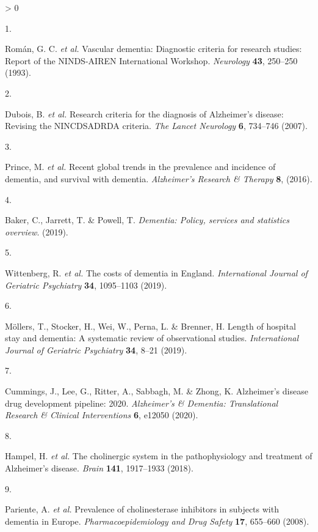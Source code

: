 \documentclass[a4paper, twoside]{templates/ociamthesis}
\newlength{\cslhangindent}
\newlength{\csllabelwidth}
\newenvironment{CSLReferences}[3] %
 {%
  \setlength{\parindent}{0pt}
  \ifodd #1 \everypar{\setlength{\hangindent}{\cslhangindent}}\ignorespaces\fi
  \ifnum #2 > 0
  \setlength{\parskip}{#2\baselineskip}
  \fi
 }%
 {}
\newcommand{\CSLLeftMargin}[1]{\parbox[t]{\maxof{\widthof{#1}}{\csllabelwidth}}{#1}}
\newcommand{\CSLRightInline}[1]{\parbox[t]{\linewidth - \csllabelwidth}{#1}}
\begin{document}
\hypertarget{refs}{}
\begin{CSLReferences}{0}{0}
\leavevmode\hypertarget{ref-roman1993vascular}{}%
\CSLLeftMargin{1. }
\CSLRightInline{Román, G. C. \emph{et al.} Vascular dementia: Diagnostic criteria for research studies: Report of the {NINDS}-{AIREN International Workshop}. \emph{Neurology} \textbf{43}, 250--250 (1993).}

\leavevmode\hypertarget{ref-dubois2007}{}%
\CSLLeftMargin{2. }
\CSLRightInline{Dubois, B. \emph{et al.} Research criteria for the diagnosis of {Alzheimer}'s disease: Revising the {NINCDS}{{ADRDA}} criteria. \emph{The Lancet Neurology} \textbf{6}, 734--746 (2007).}

\leavevmode\hypertarget{ref-prince2016}{}%
\CSLLeftMargin{3. }
\CSLRightInline{Prince, M. \emph{et al.} Recent global trends in the prevalence and incidence of dementia, and survival with dementia. \emph{Alzheimer's Research \& Therapy} \textbf{8}, (2016).}

\leavevmode\hypertarget{ref-baker2019}{}%
\CSLLeftMargin{4. }
\CSLRightInline{Baker, C., Jarrett, T. \& Powell, T. \emph{Dementia: Policy, services and statistics overview}. (2019).}

\leavevmode\hypertarget{ref-wittenberg2019}{}%
\CSLLeftMargin{5. }
\CSLRightInline{Wittenberg, R. \emph{et al.} The costs of dementia in {England}. \emph{International Journal of Geriatric Psychiatry} \textbf{34}, 1095--1103 (2019).}

\leavevmode\hypertarget{ref-mollers2019}{}%
\CSLLeftMargin{6. }
\CSLRightInline{Möllers, T., Stocker, H., Wei, W., Perna, L. \& Brenner, H. Length of hospital stay and dementia: {A} systematic review of observational studies. \emph{International Journal of Geriatric Psychiatry} \textbf{34}, 8--21 (2019).}

\leavevmode\hypertarget{ref-cummings2020}{}%
\CSLLeftMargin{7. }
\CSLRightInline{Cummings, J., Lee, G., Ritter, A., Sabbagh, M. \& Zhong, K. Alzheimer's disease drug development pipeline: 2020. \emph{Alzheimer's \& Dementia: Translational Research \& Clinical Interventions} \textbf{6}, e12050 (2020).}

\leavevmode\hypertarget{ref-hampel2018}{}%
\CSLLeftMargin{8. }
\CSLRightInline{Hampel, H. \emph{et al.} The cholinergic system in the pathophysiology and treatment of {Alzheimer}'s disease. \emph{Brain} \textbf{141}, 1917--1933 (2018).}

\leavevmode\hypertarget{ref-pariente2008}{}%
\CSLLeftMargin{9. }
\CSLRightInline{Pariente, A. \emph{et al.} Prevalence of cholinesterase inhibitors in subjects with dementia in {Europe}. \emph{Pharmacoepidemiology and Drug Safety} \textbf{17}, 655--660 (2008).}


\end{CSLReferences}
\end{document}
